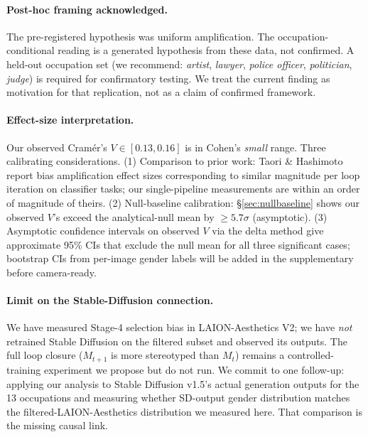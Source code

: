 \documentclass[manuscript, nonacm, screen, review]{acmart}
\begin{document}
\paragraph{Post-hoc framing acknowledged.} The pre-registered hypothesis was uniform amplification. The occupation-conditional reading is a generated hypothesis from these data, not confirmed. A held-out occupation set (we recommend: \emph{artist}, \emph{lawyer}, \emph{police officer}, \emph{politician}, \emph{judge}) is required for confirmatory testing. We treat the current finding as motivation for that replication, not as a claim of confirmed framework.

\paragraph{Effect-size interpretation.} Our observed Cramér's $V\!\in\![0.13, 0.16]$ is in Cohen's \emph{small} range. Three calibrating considerations. (1) Comparison to prior work: Taori \& Hashimoto~\cite{taori2022data} report bias amplification effect sizes corresponding to similar magnitude per loop iteration on classifier tasks; our single-pipeline measurements are within an order of magnitude of theirs. (2) Null-baseline calibration: §\ref{sec:nullbaseline} shows our observed $V$'s exceed the analytical-null mean by $\geq 5.7\sigma$ (asymptotic). (3) Asymptotic confidence intervals on observed $V$ via the delta method give approximate 95\% CIs that exclude the null mean for all three significant cases; bootstrap CIs from per-image gender labels will be added in the supplementary before camera-ready.

\paragraph{Limit on the Stable-Diffusion connection.} We have measured Stage-4 selection bias in LAION-Aesthetics V2; we have \emph{not} retrained Stable Diffusion on the filtered subset and observed its outputs. The full loop closure ($M_{t+1}$ is more stereotyped than $M_t$) remains a controlled-training experiment we propose but do not run. We commit to one follow-up: applying our analysis to Stable Diffusion v1.5's actual generation outputs for the 13 occupations and measuring whether SD-output gender distribution matches the filtered-LAION-Aesthetics distribution we measured here. That comparison is the missing causal link.
\end{document}
